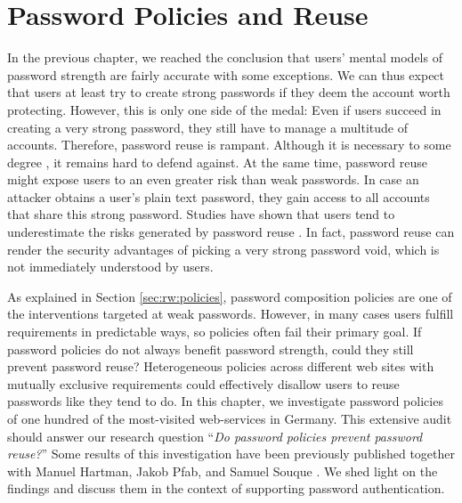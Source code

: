 \chapter[Password Policies and Reuse]{Password Policies and Reuse}\label{chap:policies_reuse}
In the previous chapter, we reached the conclusion that users' mental models of password strength are fairly accurate with some exceptions. We can thus expect that users at least try to create strong passwords if they deem the account worth protecting. 
However, this is only one side of the medal: Even if users succeed in creating a very strong password, they still have to manage a multitude of accounts. Therefore, password reuse is rampant. Although it is necessary to some degree \cite{Florencio2014PasswordPortfoliosFiniteUser, ZhangKennedy2016RevisitingPasswordRules}, it remains hard to defend against.  At the same time, password reuse might expose users to an even greater risk than weak passwords.  In case an attacker obtains a user's plain text password, they gain access to all accounts that share this strong password. Studies have shown that users tend to underestimate the risks generated by password reuse \cite{Kaspersky2016ConsumerSecurityReport}. In fact, password reuse can render the security advantages of picking a very strong password void, which is not immediately understood by users.

As explained in Section \ref{sec:rw:policies}, password composition policies are one of the interventions targeted at weak passwords. However, in many cases users fulfill requirements in predictable ways, so policies often fail their primary goal. If password policies do not always benefit password strength, could they still prevent password reuse? Heterogeneous policies across different web sites with mutually exclusive requirements could effectively disallow users to reuse passwords like they tend to do. In this chapter, we investigate password policies of one hundred of the most-visited web-services in Germany. This extensive audit should answer our research question ``\textit{Do password policies prevent password reuse?}'' Some results of this investigation have been previously published together with Manuel Hartman, Jakob Pfab, and Samuel Souque \cite{Seitz2017PoliciesReuse}. We shed light on the findings and discuss them in the context of supporting password authentication. 

